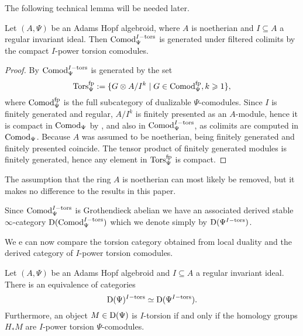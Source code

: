 The following technical lemma will be needed later. 

\begin{lemma}
    \label{ch1:lm:torsion-comodules-generated-by-compacts}
    Let $(A,\Psi)$ be an Adams Hopf algebroid, where $A$ is noetherian and $I\subseteq A$ a regular invariant ideal. Then $\mathrm{Comod}_\Psi^{I-\mathrm{tors}}$ is generated under filtered colimits by the compact $I$-power torsion comodules. 
\end{lemma}
\begin{proof}
    By \cite[3.4]{barthel-heard-valenzuela_2020} $\mathrm{Comod}_\Psi^{I-\mathrm{tors}}$ is generated by the set 
    $$\mathrm{Tors}^{\mathrm{fp}}_\Psi:=\{G\otimes A/I^k \mid G \in \mathrm{Comod}^{\mathrm{fp}}_\Psi, k\geqslant 1\},$$
    where $\mathrm{Comod}^{\mathrm{fp}}_\Psi$ is the full subcategory of dualizable $\Psi$-comodules. Since $I$ is finitely generated and regular, $A/I^k$ is finitely presented as an $A$-module, hence it is compact in $\mathrm{Comod}_\Psi$ by \cite[1.4.2]{hovey_04}, and also in $\mathrm{Comod}_\Psi^{I-\mathrm{tors}}$, as colimits are computed in $\mathrm{Comod}_\Psi$. Because $A$ was assumed to be noetherian, being finitely generated and finitely presented coincide. The tensor product of finitely generated modules is finitely generated, hence any element in $\mathrm{Tors}^{\mathrm{fp}}_\Psi$ is compact. 
\end{proof}

\begin{remark}
    The assumption that the ring $A$ is noetherian can most likely be removed, but it makes no difference to the results in this paper.  
\end{remark}

\begin{notation}
    Since $\mathrm{Comod}_\Psi^{I-\mathrm{tors}}$ is Grothendieck abelian we have an associated derived stable $\infty$-category $\mathrm{D}(\mathrm{Comod}_\Psi^{I-\mathrm{tors}})$ which we denote simply by $\mathrm{D}(\Psi^{I-\mathrm{tors}})$.
\end{notation}

We e can now compare the torsion category obtained from local duality and the derived category of $I$-power torsion comodules. 

\begin{lemma}
    \label{ch1:lm:derived-torsion-if-homology-torsion}
    Let $(A,\Psi)$ be an Adams Hopf algebroid and $I\subseteq A$ a regular invariant ideal. There is an equivalence of categories 
    \[\mathrm{D}(\Psi)^{I-\mathrm{tors}}\simeq \mathrm{D}(\Psi^{I-\mathrm{tors}}).\] 
    Furthermore, an object $M\in \mathrm{D}(\Psi)$ is $I$-torsion if and only if the homology groups $H_* M$ are $I$-power torsion $\Psi$-comodules.
\end{lemma}

